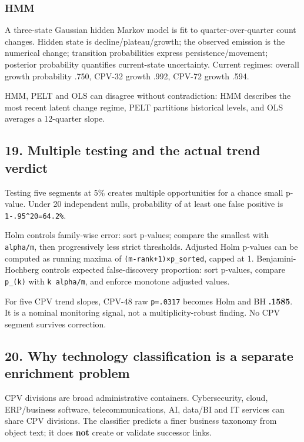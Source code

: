 \subsubsection{HMM}\label{hmm}

A three-state Gaussian hidden Markov model is fit to
quarter-over-quarter count changes. Hidden state is
decline/plateau/growth; the observed emission is the numerical change;
transition probabilities express persistence/movement; posterior
probability quantifies current-state uncertainty. Current regimes:
overall growth probability .750, CPV-32 growth .992, CPV-72 growth .594.

HMM, PELT and OLS can disagree without contradiction: HMM describes the
most recent latent change regime, PELT partitions historical levels, and
OLS averages a 12-quarter slope.

\subsection{19. Multiple testing and the actual trend
verdict}\label{19-multiple-testing-and-the-actual-trend-verdict}

Testing five segments at 5\% creates multiple opportunities for a chance
small p-value. Under 20 independent nulls, probability of at least one
false positive is \texttt{1-.95\^{}20=64.2\%}.

Holm controls family-wise error: sort p-values; compare the smallest
with \texttt{alpha/m}, then progressively less strict thresholds.
Adjusted Holm p-values can be computed as running maxima of
\texttt{(m-rank+1)×p\_sorted}, capped at 1. Benjamini-Hochberg controls
expected false-discovery proportion: sort p-values, compare
\texttt{p\_(k)} with \texttt{k\ alpha/m}, and enforce monotone adjusted
values.

For five CPV trend slopes, CPV-48 raw \texttt{p=.0317} becomes Holm and
BH \textbf{.1585}. It is a nominal monitoring signal, not a
multiplicity-robust finding. No CPV segment survives correction.

\subsection{20. Why technology classification is a separate enrichment
problem}\label{20-why-technology-classification-is-a-separate-enrichment-problem}

CPV divisions are broad administrative containers. Cybersecurity, cloud,
ERP/business software, telecommunications, AI, data/BI and IT services
can share CPV divisions. The classifier predicts a finer business
taxonomy from object text; it does \textbf{not} create or validate
successor links.


